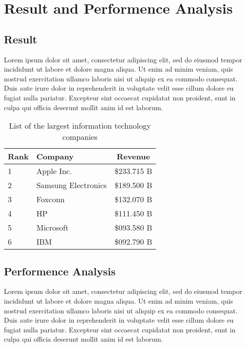 \chapter{Result and Performence Analysis}

\section{Result}

\noindent Lorem ipsum dolor sit amet, consectetur adipiscing elit, sed do eiusmod tempor incididunt ut labore et dolore magna aliqua. Ut enim ad minim veniam, quis nostrud exercitation ullamco laboris nisi ut aliquip ex ea commodo consequat. Duis aute irure dolor in reprehenderit in voluptate velit esse cillum dolore eu fugiat nulla pariatur. Excepteur sint occaecat cupidatat non proident, sunt in culpa qui officia deserunt mollit anim id est laborum.\newline

\begin{table}[H]
        \caption{List of the largest information technology companies}
        \begin{center}
                \begin{tabular}{|l|l|c|}\hline
                        Rank & Company             & Revenue     \\ \hline
                        1    & Apple Inc.          & \$233.715 B \\ \hline
                        2    & Samsung Electronics & \$189.500 B \\ \hline
                        3    & Foxconn             & \$132.070 B \\ \hline
                        4    & HP                  & \$111.450 B \\ \hline
                        5    & Microsoft           & \$093.580 B \\ \hline
                        6    & IBM                 & \$092.790 B \\ \hline
                \end{tabular}
        \end{center}
        \label{tab:result}
\end{table}

\section{Performence Analysis}
\noindent Lorem ipsum dolor sit amet, consectetur adipiscing elit, sed do eiusmod tempor incididunt ut labore et dolore magna aliqua. Ut enim ad minim veniam, quis nostrud exercitation ullamco laboris nisi ut aliquip ex ea commodo consequat. Duis aute irure dolor in reprehenderit in voluptate velit esse cillum dolore eu fugiat nulla pariatur. Excepteur sint occaecat cupidatat non proident, sunt in culpa qui officia deserunt mollit anim id est laborum.
